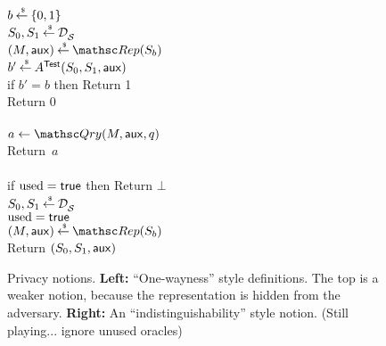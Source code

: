 \begin{figure}[htbp]
\centering
{}
%
{
{
\\
$b {\:\stackrel{{\scriptscriptstyle \hspace{0.2em}\$}} {\leftarrow}\:} \{0,1\}$\\
$S_0,S_1 {\:\stackrel{{\scriptscriptstyle \hspace{0.2em}\$}} {\leftarrow}\:} \mathcal{D}_{{\cal S}}^{}$\\
$(M,\aux) \getsr \Rep(S_b)$\\
$b' {\:\stackrel{{\scriptscriptstyle \hspace{0.2em}\$}} {\leftarrow}\:} A^{\mathsf{Test}}(S_0,S_1,{\sf aux})$\\
if $b' = b$ then Return 1\\
Return 0\\
}
%
{
\\
$a \gets \Qry(M,\aux,q)$\\
Return~$a$\\

\medskip
{}\\
if $\mathrm{used}=\mathsf{true}$ then Return $\bot$\\
$S_0,S_1 {\:\stackrel{{\scriptscriptstyle \hspace{0.2em}\$}} {\leftarrow}\:} \mathcal{D}_{{\cal S}}^{}$\\
$\mathrm{used}=\mathsf{true}$\\
$(M,\aux) \getsr \Rep(S_b)$\\
Return $(S_0,S_1,{\sf aux})$\\

}
}
\caption{Privacy notions. {\bf Left:} ``One-wayness'' style
  definitions. The top is a weaker notion, because the representation
  is hidden from the adversary. {\bf Right:} An
  ``indistinguishability'' style notion. (Still playing... ignore unused oracles)} 
\label{fig:privacy}
\end{figure}

